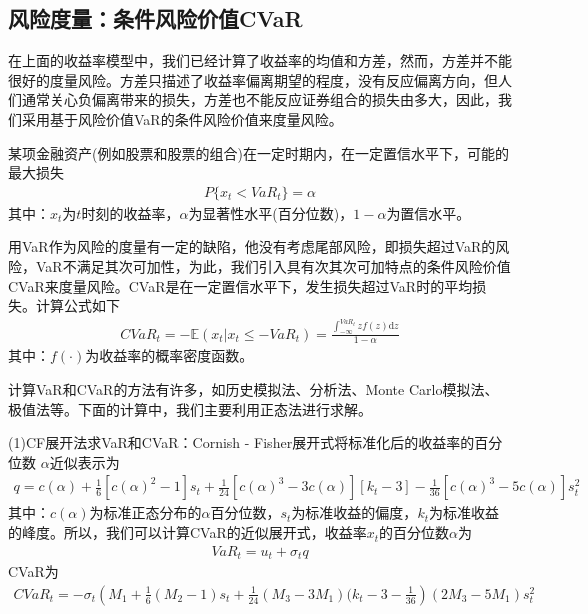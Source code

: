     \subsection{风险度量：条件风险价值CVaR}
        \par
        在上面的收益率模型中，我们已经计算了收益率的均值和方差，然而，方差并不能很好的度量风险。方差只描述了收益率偏离期望的程度，没有反应偏离方向，但人们通常关心负偏离带来的损失，方差也不能反应证券组合的损失由多大，因此，我们采用基于风险价值VaR的条件风险价值来度量风险。
        \begin{definition}[风险价值VaR]
        某项金融资产(例如股票和股票的组合)在一定时期内，在一定置信水平下，可能的最大损失
        \begin{align*}
        P\{x_t < VaR_t\} = \alpha
        \end{align*}
        其中：$x_t$为$t$时刻的收益率，$\alpha$为显著性水平(百分位数)，$1-\alpha$为置信水平。
        \end{definition}
        \par
        用VaR作为风险的度量有一定的缺陷，他没有考虑尾部风险，即损失超过VaR的风险，VaR不满足其次可加性，为此，我们引入具有次其次可加特点的条件风险价值CVaR来度量风险。CVaR是在一定置信水平下，发生损失超过VaR时的平均损失。计算公式如下
        \begin{align*}
        CVaR_t = -\mathbb{E}(x_t|x_t \leqslant -VaR_t ) = \frac{\int_{-\infty}^{VaR_t}zf(z)\mathrm{d}z}{1-\alpha}
        \end{align*}
        其中：$f(\cdot)$为收益率的概率密度函数。
        \par
        计算VaR和CVaR的方法有许多，如历史模拟法、分析法、Monte Carlo模拟法、极值法等。下面的计算中，我们主要利用正态法进行求解。
        \par
        (1)CF展开法求VaR和CVaR：Cornish - Fisher展开式将标准化后的收益率的百分位数 $\alpha$近似表示为
        \begin{align*}
        q = c(\alpha)+\frac{1}{6} [c(\alpha)^2-1]s_t+\frac{1}{24}[c(\alpha)^3-3c(\alpha)][k_t-3]-\frac{1}{36}[c(\alpha)^3-5c(\alpha)]s_t^2
        \end{align*}
        其中：$c(\alpha)$为标准正态分布的$\alpha$百分位数，$s_t$为标准收益的偏度，$k_t$为标准收益的峰度。所以，我们可以计算CVaR的近似展开式，收益率$x_t$的百分位数$\alpha$为
        \begin{align*}
        VaR_t = u_t + \sigma_tq
        \end{align*}
        CVaR为
        \begin{align*}
        CVaR_t = -\sigma_t \left( M_1+\frac{1}{6}(M_2-1)s_t+\frac{1}{24}(M_3-3M_1)(k_t-3-\frac{1}{36} \right) (2M_3-5M_1)s_t^2
        \end{align*}
